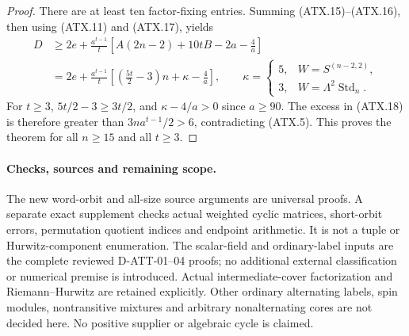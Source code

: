 \begin{proof}
There are at least ten factor-fixing entries.  Summing
(ATX.15)--(ATX.16), then using (ATX.11) and (ATX.17), yields
\[
\begin{split}
 D&\ge2e+\frac{a^{t-1}}t
       \left[A(2n-2)+10tB-2a-\frac4a\right]\\
  &=2e+\frac{a^{t-1}}t
       \left[\left(\frac{5t}{2}-3\right)n
                    +\kappa-\frac4a\right],
 \qquad
 \kappa=\begin{cases}5,&W=S^{(n-2,2)},\\3,&W=\Lambda^2\operatorname{Std}_n.
              \end{cases}
\end{split}
\tag{ATX.18}
\]
For $t\ge3$, $5t/2-3\ge3t/2$, and
$\kappa-4/a>0$ since $a\ge90$.  The excess in (ATX.18) is
therefore greater than $3na^{t-1}/2>6$, contradicting (ATX.5).
This proves the theorem for all $n\ge15$ and all $t\ge3$.
\end{proof}

\paragraph{Checks, sources and remaining scope.}
The new word-orbit and all-size source arguments are universal
proofs.  A separate exact supplement checks actual weighted cyclic
matrices, short-orbit errors, permutation quotient indices and
endpoint arithmetic.  It is not a tuple or Hurwitz-component
enumeration.  The scalar-field and ordinary-label inputs are the
complete reviewed D-ATT-01--04 proofs; no additional external
classification or numerical premise is introduced.  Actual
intermediate-cover factorization and Riemann--Hurwitz are retained
explicitly.  Other ordinary alternating labels, spin modules,
nontransitive mixtures and arbitrary nonalternating cores are not
decided here.  No positive supplier or algebraic cycle is claimed.

